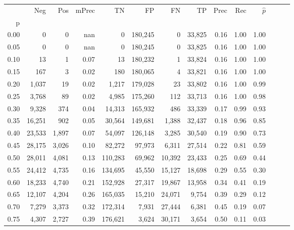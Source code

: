 \begin{tabular}{rrrrrrrrrrrrrr}
\toprule
{} &     Neg &    Pos & mPrec &       TN &       FP &      FN &      TP &  Prec &   Rec & $\hat{p}$ \\
p    &         &        &       &          &          &         &         &       &       &           \\
\midrule
0.00 &       0 &      0 &   nan &        0 &  180,245 &       0 &  33,825 &  0.16 &  1.00 &      1.00 \\
0.05 &       0 &      0 &   nan &        0 &  180,245 &       0 &  33,825 &  0.16 &  1.00 &      1.00 \\
0.10 &      13 &      1 &  0.07 &       13 &  180,232 &       1 &  33,824 &  0.16 &  1.00 &      1.00 \\
0.15 &     167 &      3 &  0.02 &      180 &  180,065 &       4 &  33,821 &  0.16 &  1.00 &      1.00 \\
0.20 &   1,037 &     19 &  0.02 &    1,217 &  179,028 &      23 &  33,802 &  0.16 &  1.00 &      0.99 \\
0.25 &   3,768 &     89 &  0.02 &    4,985 &  175,260 &     112 &  33,713 &  0.16 &  1.00 &      0.98 \\
0.30 &   9,328 &    374 &  0.04 &   14,313 &  165,932 &     486 &  33,339 &  0.17 &  0.99 &      0.93 \\
0.35 &  16,251 &    902 &  0.05 &   30,564 &  149,681 &   1,388 &  32,437 &  0.18 &  0.96 &      0.85 \\
0.40 &  23,533 &  1,897 &  0.07 &   54,097 &  126,148 &   3,285 &  30,540 &  0.19 &  0.90 &      0.73 \\
0.45 &  28,175 &  3,026 &  0.10 &   82,272 &   97,973 &   6,311 &  27,514 &  0.22 &  0.81 &      0.59 \\
0.50 &  28,011 &  4,081 &  0.13 &  110,283 &   69,962 &  10,392 &  23,433 &  0.25 &  0.69 &      0.44 \\
0.55 &  24,412 &  4,735 &  0.16 &  134,695 &   45,550 &  15,127 &  18,698 &  0.29 &  0.55 &      0.30 \\
0.60 &  18,233 &  4,740 &  0.21 &  152,928 &   27,317 &  19,867 &  13,958 &  0.34 &  0.41 &      0.19 \\
0.65 &  12,107 &  4,204 &  0.26 &  165,035 &   15,210 &  24,071 &   9,754 &  0.39 &  0.29 &      0.12 \\
0.70 &   7,279 &  3,373 &  0.32 &  172,314 &    7,931 &  27,444 &   6,381 &  0.45 &  0.19 &      0.07 \\
0.75 &   4,307 &  2,727 &  0.39 &  176,621 &    3,624 &  30,171 &   3,654 &  0.50 &  0.11 &      0.03 \\

\end{tabular}

